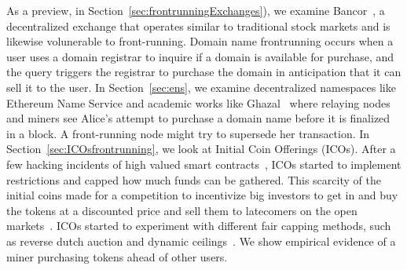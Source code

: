 As a preview, in Section~\ref{sec:frontrunningExchanges}), we examine Bancor~\cite{hertzog2017bancor}, a decentralized exchange that operates similar to traditional stock markets and is likewise volunerable to front-running. Domain name frontrunning occurs when a user uses a domain registrar to inquire if a domain is available for purchase, and the query triggers the registrar to purchase the domain in anticipation that it can sell it to the user. In Section~\ref{sec:ens}, we examine decentralized namespaces like Ethereum Name Service and academic works like Ghazal~\cite{moosavighazal} where relaying nodes and miners see Alice's attempt to purchase a domain name before it is finalized in a block. A front-running node might try to supersede her transaction. In Section~\ref{sec:ICOsfrontrunning}, we look at Initial Coin Offerings (ICOs). After a few hacking incidents of high valued smart contracts~\cite{siegel2016daohack}, ICOs started to implement restrictions and capped how much funds can be gathered. This scarcity of the initial coins made for a competition to incentivize big investors to get in and buy the tokens at a discounted price and sell them to latecomers on the open markets~\cite{zetzsche2018ico, li2018initial}. ICOs started to experiment with different fair capping methods, such as reverse dutch auction and dynamic ceilings~\cite{kaal2017initial}. We show empirical evidence of a miner purchasing tokens ahead of other users. 




